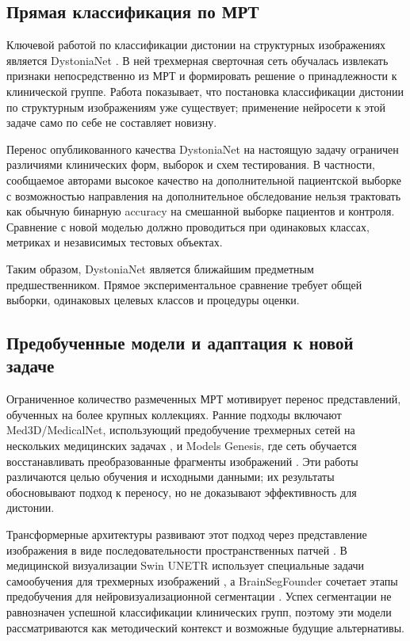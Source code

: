 \documentclass[11pt,a4paper]{article}
\begin{document}
\subsection{Прямая классификация по МРТ}

Ключевой работой по классификации дистонии на структурных изображениях является DystoniaNet \cite{ref06}. В ней трехмерная сверточная сеть обучалась извлекать признаки непосредственно из МРТ и формировать решение о принадлежности к клинической группе. Работа показывает, что постановка классификации дистонии по структурным изображениям уже существует; применение нейросети к этой задаче само по себе не составляет новизну.

Перенос опубликованного качества DystoniaNet на настоящую задачу ограничен различиями клинических форм, выборок и схем тестирования. В частности, сообщаемое авторами высокое качество на дополнительной пациентской выборке с возможностью направления на дополнительное обследование нельзя трактовать как обычную бинарную accuracy на смешанной выборке пациентов и контроля. Сравнение с новой моделью должно проводиться при одинаковых классах, метриках и независимых тестовых объектах.

Таким образом, DystoniaNet является ближайшим предметным предшественником. Прямое экспериментальное сравнение требует общей выборки, одинаковых целевых классов и процедуры оценки.

\subsection{Предобученные модели и адаптация к новой задаче}

Ограниченное количество размеченных МРТ мотивирует перенос представлений, обученных на более крупных коллекциях. Ранние подходы включают Med3D/MedicalNet, использующий предобучение трехмерных сетей на нескольких медицинских задачах \cite{ref15}, и Models Genesis, где сеть обучается восстанавливать преобразованные фрагменты изображений \cite{ref16}. Эти работы различаются целью обучения и исходными данными; их результаты обосновывают подход к переносу, но не доказывают эффективность для дистонии.

Трансформерные архитектуры развивают этот подход через представление изображения в виде последовательности пространственных патчей \cite{ref18}. В медицинской визуализации Swin UNETR использует специальные задачи самообучения для трехмерных изображений \cite{ref17}, а BrainSegFounder сочетает этапы предобучения для нейровизуализационной сегментации \cite{ref10}. Успех сегментации не равнозначен успешной классификации клинических групп, поэтому эти модели рассматриваются как методический контекст и возможные будущие альтернативы.
\end{document}
